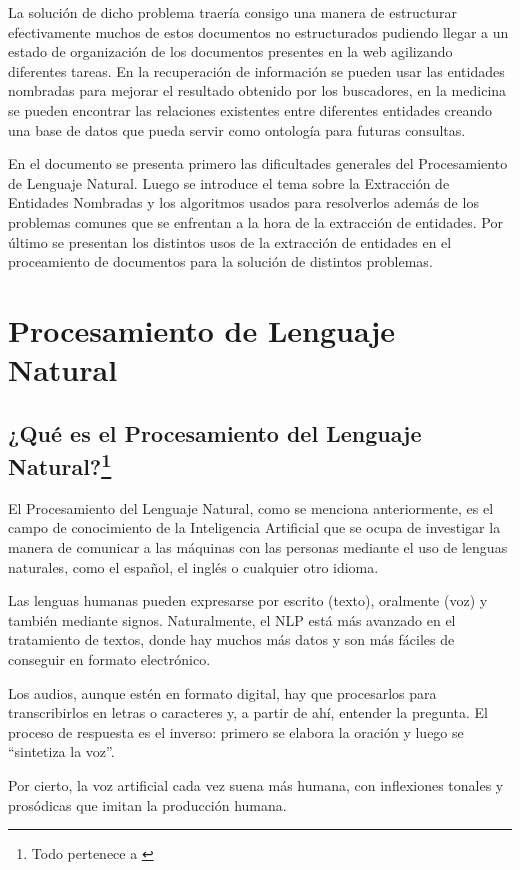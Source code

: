\documentclass[runningheads]{llncs}
\begin{document}
La solución de dicho problema traería consigo una manera de estructurar efectivamente muchos de estos documentos no estructurados pudiendo llegar a un estado de organización de los documentos presentes en la web agilizando diferentes tareas. En la recuperación de información se pueden usar las entidades nombradas para mejorar el resultado obtenido por los buscadores, en la medicina se pueden encontrar las relaciones existentes entre diferentes entidades creando una base de datos que pueda servir como ontología para futuras consultas.

En el documento se presenta primero las dificultades generales del Procesamiento de Lenguaje Natural. Luego se introduce el tema sobre la Extracción de Entidades Nombradas y los algoritmos usados para resolverlos además de los problemas comunes que se enfrentan a la hora de la extracción de entidades. Por último se presentan los distintos usos de la extracción de entidades en el proceamiento de documentos para la solución de distintos problemas.

\section{Procesamiento de Lenguaje Natural}

\subsection{¿Qué es el Procesamiento del Lenguaje Natural?\protect\footnote{Todo pertenece a \cite{nlp}}}
El Procesamiento del Lenguaje Natural, como se menciona anteriormente, es el campo de conocimiento de la Inteligencia Artificial que se ocupa de investigar la manera de comunicar a las máquinas con las personas mediante el uso de lenguas naturales, como el español, el inglés o cualquier 
otro idioma.

Las lenguas humanas pueden expresarse por escrito (texto), oralmente (voz) y también mediante signos. Naturalmente, el NLP está más avanzado en el tratamiento de textos, donde hay muchos más datos y son más fáciles de conseguir en formato electrónico.

Los audios, aunque estén en formato digital, hay que procesarlos para transcribirlos en letras o caracteres y, a partir de ahí, entender la pregunta. El proceso de respuesta es el inverso: primero se elabora la oración y luego se “sintetiza la voz”.

Por cierto, la voz artificial cada vez suena más humana, con inflexiones tonales y prosódicas que imitan la producción humana.
\end{document}

